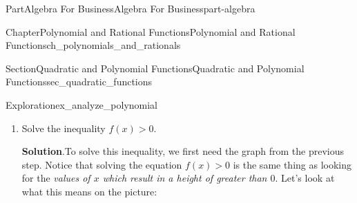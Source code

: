 \documentclass[oneside,10pt,]{tufte-book}
\newcommand{\blocktitlefont}{\relax}
\numberwithin{equation}{chapter}
\newcommand{\lt}{<}
\newcommand{\gt}{>}
\begin{document}
\begin{partptx}{Part}{Algebra For Business}{}{Algebra For Business}{}{}{part-algebra}
\begin{chapterptx}{Chapter}{Polynomial and Rational Functions}{}{Polynomial and Rational Functions}{}{}{ch_polynomials_and_rationals}
\begin{sectionptx}{Section}{Quadratic and Polynomial Functions}{}{Quadratic and Polynomial Functions}{}{}{sec_quadratic_functions}
\begin{exploration}{Exploration}{}{ex_analyze_polynomial}
\begin{enumerate}[font=\bfseries,label=(\alph*),ref=\alph*]
\par\smallskip%
\noindent\textbf{\blocktitlefont Solution}.\hypertarget{ex_analyze_polynomial-4-2}{}\quad{}Recall that the shape of a quadratic depends only on the coefficient \(a\)	of \(x^2\).  Because \(a=-1\lt 0\), the graph of the function is a parabola that opens down.%
\par
We have also already found the \(x\)-intercepts \(x=1\) and \(x=2\) and the vertex \((1.5,0.25)\).  Putting this all together we get the following picture:%
\begin{image}{0.125}{0.75}{0.125}{}%
%
\end{image}%
\item{}Solve the inequality \(f(x)>0\).%
\par\smallskip%
\noindent\textbf{\blocktitlefont Solution}.\hypertarget{ex_analyze_polynomial-5-2}{}\quad{}To solve this inequality, we first need the graph from the previous step.  Notice that solving the equation \(f(x)\gt 0\) is the same thing as looking for the \emph{values of \(x\) which result in a height of greater than \(0\)}. Let's look at what this means on the picture:%
\begin{image}{0.125}{0.75}{0.125}{}%
\end{image}
\end{enumerate}
\end{exploration}
\end{sectionptx}
\end{chapterptx}
\end{partptx}
\end{document}
